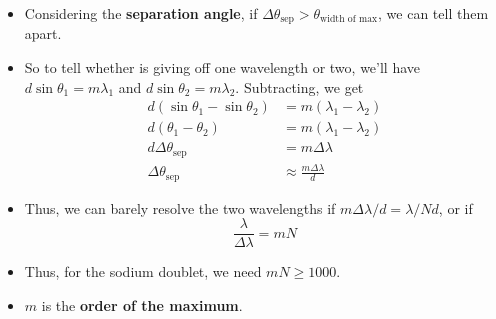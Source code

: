 \documentclass[../notes.tex]{subfiles}
\begin{document}
\begin{itemize}
\begin{itemize}
        \item Considering the \textbf{separation angle}, if $\Delta\theta_\text{sep}>\theta_\text{width of max}$, we can tell them apart.
        \item So to tell whether  is giving off one wavelength or two, we'll have $d\sin\theta_1=m\lambda_1$ and $d\sin\theta_2=m\lambda_2$. Subtracting, we get
        \begin{align*}
            d(\sin\theta_1-\sin\theta_2) &= m(\lambda_1-\lambda_2)\\
            d(\theta_1-\theta_2) &= m(\lambda_1-\lambda_2)\\
            d\Delta\theta_\text{sep} &= m\Delta\lambda\\
            \Delta\theta_\text{sep} &\approx \frac{m\Delta\lambda}{d}
        \end{align*}
        \item Thus, we can barely resolve the two wavelengths if $m\Delta\lambda/d=\lambda/Nd$, or if
        \begin{equation*}
            \frac{\lambda}{\Delta\lambda} = mN
        \end{equation*}
        \item Thus, for the sodium doublet, we need $mN\geq 1000$.
        \item $m$ is the \textbf{order of the maximum}.
    \end{itemize}
\end{itemize}
\end{document}
